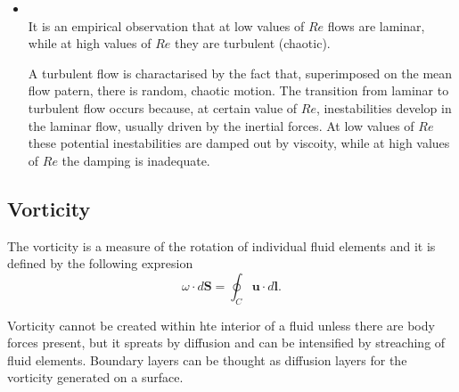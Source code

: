 \begin{itemize}
\item{}\\It is an empirical observation that at low values of $Re$ flows are laminar, while at high values of $Re$ they are turbulent (chaotic).

A turbulent flow is charactarised by the fact that, superimposed on the mean flow patern, there is random, chaotic motion. The transition from laminar to turbulent flow occurs because, at certain value of $Re$, inestabilities develop in the laminar flow, usually driven by the inertial forces. At low values of $Re$ these potential inestabilities are damped out by viscoity, while at high values of $Re$ the damping is inadequate.

\end{itemize}

\subsection{Vorticity}
The vorticity is a measure of the rotation of individual fluid elements and it is defined by the following expresion
$$\omega\cdot d\mathbf{S}=\oint_C\mathbf{u}\cdot d\mathbf{l}.$$

Vorticity cannot be created within hte interior of a fluid unless there are body forces present, but it spreats by diffusion and can be intensified by streaching of fluid elements. Boundary layers can be thought as diffusion layers for the vorticity generated on a surface.

